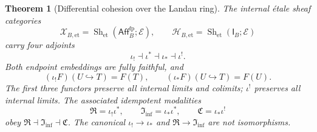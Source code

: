 \documentclass[11pt,a4paper]{article}
\numberwithin{algorithm}{section}
\numberwithin{equation}{section}
\newtheorem{theorem}{Theorem}[section]
\theoremstyle{definition}
\theoremstyle{remark}
\theoremstyle{plain}
\newcommand{\E}{\mathcal E}
\newcommand{\InfShape}{\mathfrak I_{\mathrm{inf}}}
\newcommand{\AffB}{\mathsf{Aff}^{\mathrm{fp}}_B}
\newcommand{\InfB}{\mathsf I_B}
\newcommand{\BaseEt}{\mathscr X_{B,\mathrm{et}}}
\newcommand{\ThickEt}{\mathscr H_{B,\mathrm{et}}}
\newcommand{\ShEt}{\operatorname{Sh}_{\mathrm{et}}}
\theoremstyle{definition}
\theoremstyle{plain}
\begin{document}
\begin{theorem}[Differential cohesion over the Landau ring]
\label{thm:etale-endpoint-cohesion}
The internal \'etale sheaf categories
\[
 \BaseEt=\ShEt(\AffB;\E),\qquad
 \ThickEt=\ShEt(\InfB;\E)
\]
carry four adjoints
\begin{equation}\label{eq:etale-endpoint-adjunction}
 \iota_!\dashv\iota^*\dashv\iota_*\dashv\iota^!.
\end{equation}
Both endpoint embeddings are fully faithful, and
\[
 (\iota_!F)(U\hookrightarrow T)=F(T),\qquad
 (\iota_*F)(U\hookrightarrow T)=F(U).
\]
The first three functors preserve all internal limits and colimits;
$\iota^!$ preserves all internal limits.  The associated idempotent
modalities
\[
 \mathfrak R=\iota_!\iota^*,\qquad
 \InfShape=\iota_*\iota^*,\qquad
 \mathfrak C=\iota_*\iota^!
\]
obey $\mathfrak R\dashv\InfShape\dashv\mathfrak C$.
The canonical
$\iota_!\to\iota_*$ and $\mathfrak R\to\InfShape$ are not
isomorphisms.
\end{theorem}
\end{document}
